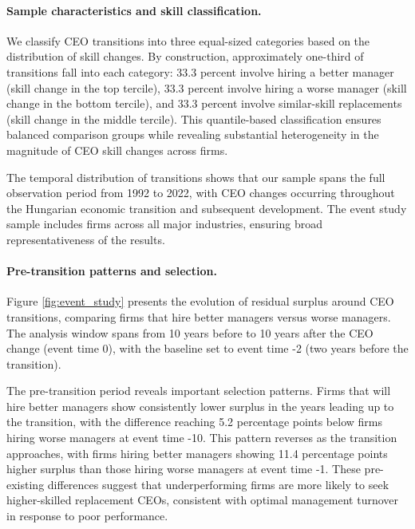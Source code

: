 \documentclass[11pt,a4paper]{article}
\begin{document}
\paragraph{Sample characteristics and skill classification.} We classify CEO transitions into three equal-sized categories based on the distribution of skill changes. By construction, approximately one-third of transitions fall into each category: 33.3 percent involve hiring a better manager (skill change in the top tercile), 33.3 percent involve hiring a worse manager (skill change in the bottom tercile), and 33.3 percent involve similar-skill replacements (skill change in the middle tercile). This quantile-based classification ensures balanced comparison groups while revealing substantial heterogeneity in the magnitude of CEO skill changes across firms.

The temporal distribution of transitions shows that our sample spans the full observation period from 1992 to 2022, with CEO changes occurring throughout the Hungarian economic transition and subsequent development. The event study sample includes firms across all major industries, ensuring broad representativeness of the results.

\paragraph{Pre-transition patterns and selection.} Figure \ref{fig:event_study} presents the evolution of residual surplus around CEO transitions, comparing firms that hire better managers versus worse managers. The analysis window spans from 10 years before to 10 years after the CEO change (event time 0), with the baseline set to event time -2 (two years before the transition).

The pre-transition period reveals important selection patterns. Firms that will hire better managers show consistently lower surplus in the years leading up to the transition, with the difference reaching 5.2 percentage points below firms hiring worse managers at event time -10. This pattern reverses as the transition approaches, with firms hiring better managers showing 11.4 percentage points higher surplus than those hiring worse managers at event time -1. These pre-existing differences suggest that underperforming firms are more likely to seek higher-skilled replacement CEOs, consistent with optimal management turnover in response to poor performance.
\end{document}
